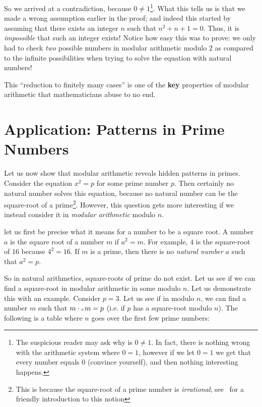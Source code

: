 \documentclass[oneside]{book}
\newcommand\scalemath[2]{\scalebox{#1}{\mbox{\ensuremath{\displaystyle #2}}}}
\newcommand{\Cdot}[1]{\cdot{\scalemath{0.6}{#1}}\,}
\begin{document}
So we arrived at a contradiction, because $0\ne 1$\footnote{The suspicious reader may ask why is $0\ne 1$. In
  fact, there is nothing wrong with the arithmetic system where $0 = 1$, however if we let $0 = 1$ we get that
every number equals $0$ (convince yourself), and then nothing interesting happens.}. What this tells us is
that we made a wrong assumption earlier in the proof; and indeed this started by assuming that there exists an
integer $n$ such that $n^2+n+1=0$. Thus, it is \emph{impossible} that such an
integer exists! Notice how easy this was to prove: we only had to check \emph{two} possible numbers in modular
arithmetic modulo $2$ as compared to the infinite possibilities when trying to solve the equation with natural
numbers!

This ``reduction to finitely many cases'' is one of the \textbf{key} properties of modular arithmetic that
mathematicians abuse to no end.


\section{Application: Patterns in Prime Numbers}

Let us now show that modular arithmetic reveals hidden patterns in primes. Consider the equation $x^2 = p$ for some prime number $p$. Then certainly no natural number solves this
equation, because no natural number can be the square-root of a prime\footnote{This is because the square-root
  of a prime number is \emph{irrational}; see~\cite{fuchsIntroductionProofsProof} for a friendly introduction
to this notion}. However, this question gets more interesting if we instead consider it in \emph{modular
arithmetic} modulo $n$.

let us first be precise what it means for a number to be a square root. A number $a$ is the
square root of a number $m$  if $a^2 = m$. For example, $4$ is the square-root of $16$
because $4^2 = 16$. If $m$ is a prime, then there is no \emph{natural number} $a$ such that $a^2
= p$.

So in natural arithmetics, square-roots of prime do not exist. Let us see if we can find
a square-root in modular arithmetic in some modulo $n$. Let us demonstrate this with an
example. Consider $p = 3$. Let us see if in modulo $n$, we can find a number $m$ such that
$m\Cdot{n} m = p$ (i.e. if $p$ has a square-root modulo $n$). The following is a table
where $n$ goes over the first few prime numbers:
\end{document}
